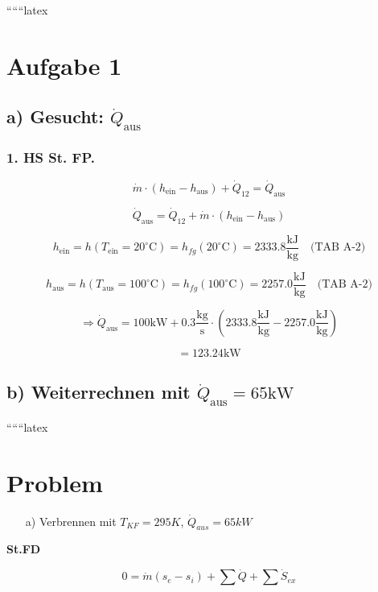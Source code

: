 
``````latex


\section*{Aufgabe 1}

\subsection*{a) Gesucht: $\dot{Q}_{\text{aus}}$}

\subsubsection*{1. HS St. FP.}

\[
\dot{m} \cdot (h_{\text{ein}} - h_{\text{aus}}) + \dot{Q}_{12} = \dot{Q}_{\text{aus}}
\]

\[
\dot{Q}_{\text{aus}} = \dot{Q}_{12} + \dot{m} \cdot (h_{\text{ein}} - h_{\text{aus}})
\]

\[
h_{\text{ein}} = h(T_{\text{ein}} = 20^\circ \text{C}) = h_{fg}(20^\circ \text{C}) = 2333.8 \frac{\text{kJ}}{\text{kg}} \quad \text{(TAB A-2)}
\]

\[
h_{\text{aus}} = h(T_{\text{aus}} = 100^\circ \text{C}) = h_{fg}(100^\circ \text{C}) = 2257.0 \frac{\text{kJ}}{\text{kg}} \quad \text{(TAB A-2)}
\]

\[
\Rightarrow \dot{Q}_{\text{aus}} = 100 \text{kW} + 0.3 \frac{\text{kg}}{\text{s}} \cdot (2333.8 \frac{\text{kJ}}{\text{kg}} - 2257.0 \frac{\text{kJ}}{\text{kg}})
\]

\[
= 123.24 \text{kW}
\]

\subsection*{b) Weiterrechnen mit $\dot{Q}_{\text{aus}} = 65 \text{kW}$}

``````latex


\section*{Problem}

\begin{itemize}
    \item[a)] Verbrennen mit $T_{KF} = 295K$, $\dot{Q}_{aus} = 65kW$
\end{itemize}

\textbf{St.FD}

\[
0 = \dot{m}(s_e - s_i) + \sum \dot{Q} + \sum \dot{S}_{ex}
\]


